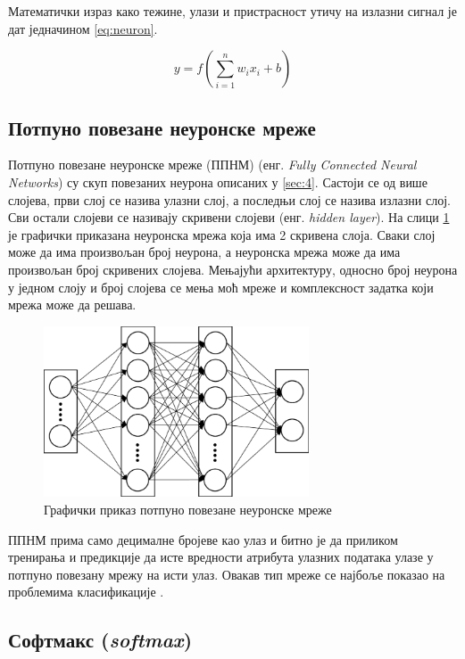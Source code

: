 Математички израз како тежине, улази и пристрасност утичу на излазни сигнал је дат једначином \ref{eq:neuron}.

\begin{equation}
    y = f\left(\sum_{i=1}^{n} w_i x_i + b\right)
    \label{eq:neuron}
\end{equation}

\subsection{Потпуно повезане неуронске мреже}
\label{sec:41}

Потпуно повезане неуронске мреже (ППНМ) (енг. \textit{Fully Connected Neural Networks}) су скуп повезаних неурона описаних у \ref{sec:4}. 
Састоји се од више слојева, први слој се назива улазни слој, а последњи слој се назива излазни слој. 
Сви остали слојеви се називају скривени слојеви (енг. \textit{hidden layer}). 
На слици \ref{fig:fc} је графички приказана неуронска мрежа која има 2 скривена слоја.
Сваки слој може да има произвољан број неурона, а неуронска мрежа може да има произвољан број скривених слојева. 
Мењајући архитектуру, односно број неурона у једном слоју и број слојева се мења моћ мреже и комплексност задатка који мрежа може да решава.

\begin{figure}[h]
    \centering
    \includegraphics[width=0.7\textwidth]{images/fc.png}
    \caption{Графички приказ потпуно повезане неуронске мреже \cite{anwar_learned_2017}}
    \label{fig:fc}
\end{figure}

ППНМ прима само децималне бројеве као улаз и битно је да приликом тренирања и предикције да исте вредности атрибута улазних података улазе у потпуно повезану мрежу на исти улаз.
Овакав тип мреже се најбоље показао на проблемима класификације \cite{noauthor_artificial_2023}.

\subsection{Софтмакс (\textit{softmax})}

